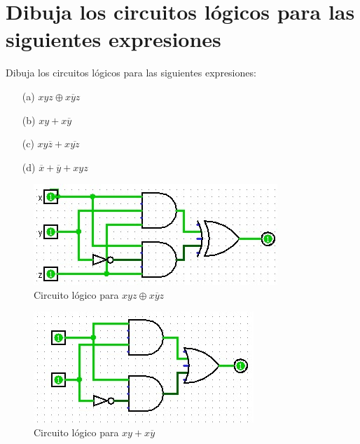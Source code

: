 \chapter*{Dibuja los circuitos lógicos para las siguientes expresiones}

Dibuja los circuitos lógicos para las siguientes expresiones:

\begin{enumerate}
    \item[(a)] $xyz \oplus x\overline{y}z$
    \item[(b)] $xy + x\overline{y}$
    \item[(c)] $xy\overline{z} + x\overline{yz}$
    \item[(d)] $\overline{x} + \overline{y} + xyz$
    
\end{enumerate}
 \begin{figure}[h!]
    \centering
    \includegraphics[width=\textwidth]{recursos/Ejercicio2/circuito_a.png}
    \caption{Circuito lógico para $xyz \oplus x\overline{y}z$}
\end{figure}
\newpage

\begin{figure}[h!]
    \centering
    \includegraphics[width=\textwidth]{recursos/Ejercicio2/circuito_b.png}
    \caption{Circuito lógico para $xy + x\overline{y}$}
\end{figure}

